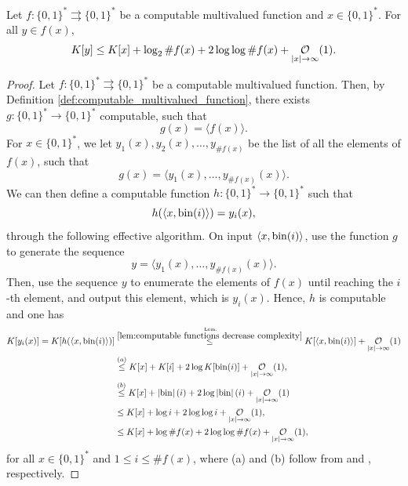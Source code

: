 \begin{theorem}\label{thm:computable multivalued functions and complexity}
    Let $f: \{0,1\}^\ast \rightrightarrows \{0,1\}^\ast$ be a computable multivalued function and $x \in \{0,1\}^\ast$. For all $y \in f(x)$,
    \begin{equation}\label{eq:main:thm:computable multivalued functions and complexity}
        K[y] \leq K[x] + \log_2 \#f(x) + 2\log \log \#f(x) + \bigOx[1]{\len x}.
    \end{equation}
\end{theorem}
\begin{proof}
    Let $f: \{0,1\}^\ast \rightrightarrows \{0,1\}^\ast$ be a computable multivalued function. Then, by Definition \ref{def:computable_multivalued_function}, there exists $g : \{0,1\}^\ast \to \{0,1\}^\ast$ computable, such that 
    \begin{equation}
        g(x) = \langle  f(x) \rangle.
    \end{equation}
    For $x \in \{0,1\}^\ast$, we let $y_1(x), y_2(x), \ldots, y_{\#f(x)}$ be the list of all the elements of $f(x)$, such that 
    \begin{equation}
        g(x) = \langle y_1(x), \ldots, y_{\#f(x)}(x) \rangle.
    \end{equation}
    We can then define a computable function $h: \{0,1\}^\ast \to \{0,1\}^\ast$ such that
    \begin{equation}
        h(\langle x, \operatorname{bin}(i) \rangle) = y_i(x),
    \end{equation}
    through the following effective algorithm. On input $\langle x, \operatorname{bin}(i) \rangle$, use the function $g$ to generate the sequence 
    \begin{equation}
        y = \langle y_1(x), \ldots, y_{\#f(x)}(x) \rangle.
    \end{equation} 
    Then, use the sequence $y$ to enumerate the elements of $f(x)$ until reaching the $i$-th element, and output this element, which is $y_i(x)$. Hence, $h$ is computable and one has
    \begin{align}
        K[y_i(x)] = K[h(\langle x, \bin(i) \rangle)] &\osetlem{\ref{lem:computable functions decrease complexity}}{\leq} K[\langle x, \bin(i) \rangle] + \bigOx[1]{\len x}\\
        &\overset{(a)}{\leq} K[x] + K[i] + 2\log K[\bin(i)] + \bigOx[1]{\len x},\\
        &\overset{(b)}{\leq} K[x] + \len \bin(i) + 2 \log \len \bin(i) + \bigOx[1]{\len x}\\
        &\leq K[x] + \log i + 2 \log \log i + \bigOx[1]{\len x},\\
        &\leq K[x] + \log \#f(x) + 2 \log \log \#f(x) + \bigOx[1]{\len x},
    \end{align}
    for all $x \in \{0,1\}^\ast$ and $1 \leq i \leq \#f(x)$, where (a) and (b) follow from \cite[Example 2.1.5]{li2008introduction} and \cite[Theorem 2.1.2]{li2008introduction}, respectively.
\end{proof}

